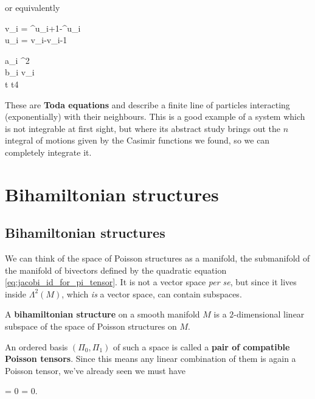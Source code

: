 \documentclass[main.tex]{subfiles}
\begin{document}
\begin{example}
\begin{eqalign}
\begin{dcases}
		\end{dcases}
	\end{eqalign}
	or equivalently
	\begin{eqalign}
		\begin{dcases}
			\dot v_i = \e^{u_i+1}-\e^{u_i}\\
			\dot u_i = v_i-v_{i-1}
		\end{dcases}
		\quad {} \quad
		\begin{dcases}
			a_i \mapsto \e^{\frac{u_i+1}2}\\
			b_i \mapsto v_i\\
			t \mapsto \frac t4
		\end{dcases}
	\end{eqalign}
	These are \textbf{Toda equations} and describe a finite line of particles interacting (exponentially) with their neighbours. This is a good example of a system which is not integrable at first sight, but where its abstract study brings out the $n$ integral of motions given by the Casimir functions we found, so we can completely integrate it.
\end{example}

\chapter{Bihamiltonian structures}
\section{Bihamiltonian structures}
We can think of the space of Poisson structures as a manifold, the submanifold of the manifold of bivectors defined by the quadratic equation \eqref{eq:jacobi_id_for_pi_tensor}. It is not a vector space \emph{per se}, but since it lives inside $\Lambda^2(M)$, which \emph{is} a vector space, can contain subspaces.

\begin{definition}
	A \textbf{bihamiltonian structure} on a smooth manifold $M$ is a $2$-dimensional linear subspace of the space of Poisson structures on $M$.
\end{definition}

An ordered basis $(\Pi_0, \Pi_1)$ of such a space is called a \textbf{pair of compatible Poisson tensors}. Since this means any linear combination of them is again a Poisson tensor, we've already seen we must have
\begin{eqalign}
	[a_0\Pi_0 + a_1\Pi_1,a_0\Pi_0 + a_1\Pi_1] = 0 \quad\Longrightarrow\quad [\Pi_0, \Pi_1] = 0.
\end{eqalign}
\end{document}
